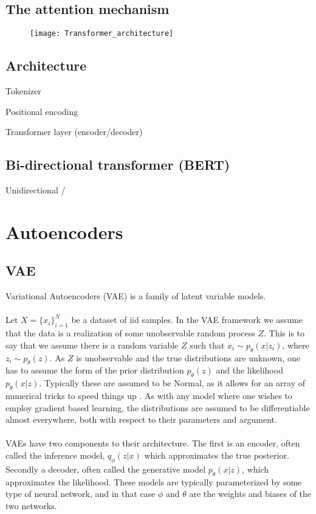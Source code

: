 \documentclass[../../thesis.tex]{subfiles}
\begin{document}
\subsection{The attention mechanism}


\begin{figure}[h]
    \texttt{[image: Transformer\_architecture]}
    \centering    
\end{figure}

\subsection{Architecture}

Tokenizer

Positional encoding


Transformer layer (encoder/decoder)

\subsection{Bi-directional transformer (BERT)}

Unidirectional / 




\section{Autoencoders}


\subsection{VAE}
Variational Autoencoders (VAE) is a family of latent variable models. 
\\\\

Let $X = \{x_i\}_{i=1}^{N}$ be a dataset of iid samples. In the VAE framework we assume that the data is a realization of some unobservable random process $Z$. This is to say that we assume there is a random variable $Z$ such that $x_i \sim p_{\theta}(x|z_i)$, where $z_i \sim p_{\theta}(z)$. As $Z$ is unobservable and the true distributions are unknown, one has to assume the form of the prior distribution $p_{\theta}(z)$ and the likelihood $p_{\theta}(x|z)$. Typically these are assumed to be Normal, as it allows for an array of numerical tricks to speed things up . As with any model where one wishes to employ gradient based learning, the distributions are assumed to be differentiable almost everywhere, both with respect to their parameters and argument. \\\\
VAEs have two components to their architecture. The first is an encoder, often called the inference model, $q_\phi(z|x)$ which approximates the true posterior. Secondly a decoder, often called the generative model $p_\theta(x|z)$, which approximates the likelihood. These models are typically parameterized by some type of neural network, and in that case $\phi$ and $\theta$ are the weights and biases of the two networks. 
\end{document}
